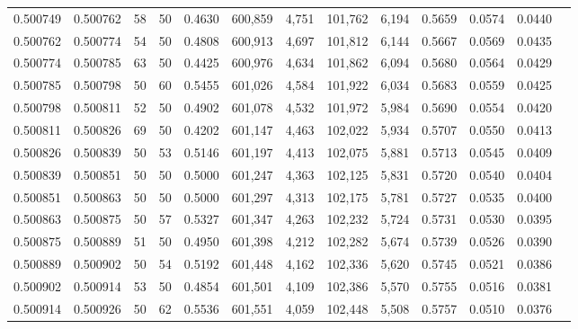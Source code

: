 \begin{tabular}{rrrrrrrrrrrrr}
0.500749 & 0.500762 &    58 &  50 &                                     0.4630 & 600,859 &   4,751 & 101,762 &   6,194 & 0.5659 & 0.0574 & 0.0440 \\
0.500762 & 0.500774 &    54 &  50 &                                     0.4808 & 600,913 &   4,697 & 101,812 &   6,144 & 0.5667 & 0.0569 & 0.0435 \\
0.500774 & 0.500785 &    63 &  50 &                                     0.4425 & 600,976 &   4,634 & 101,862 &   6,094 & 0.5680 & 0.0564 & 0.0429 \\
0.500785 & 0.500798 &    50 &  60 &                                     0.5455 & 601,026 &   4,584 & 101,922 &   6,034 & 0.5683 & 0.0559 & 0.0425 \\
0.500798 & 0.500811 &    52 &  50 &                                     0.4902 & 601,078 &   4,532 & 101,972 &   5,984 & 0.5690 & 0.0554 & 0.0420 \\
0.500811 & 0.500826 &    69 &  50 &                                     0.4202 & 601,147 &   4,463 & 102,022 &   5,934 & 0.5707 & 0.0550 & 0.0413 \\
0.500826 & 0.500839 &    50 &  53 &                                     0.5146 & 601,197 &   4,413 & 102,075 &   5,881 & 0.5713 & 0.0545 & 0.0409 \\
0.500839 & 0.500851 &    50 &  50 &                                     0.5000 & 601,247 &   4,363 & 102,125 &   5,831 & 0.5720 & 0.0540 & 0.0404 \\
0.500851 & 0.500863 &    50 &  50 &                                     0.5000 & 601,297 &   4,313 & 102,175 &   5,781 & 0.5727 & 0.0535 & 0.0400 \\
0.500863 & 0.500875 &    50 &  57 &                                     0.5327 & 601,347 &   4,263 & 102,232 &   5,724 & 0.5731 & 0.0530 & 0.0395 \\
0.500875 & 0.500889 &    51 &  50 &                                     0.4950 & 601,398 &   4,212 & 102,282 &   5,674 & 0.5739 & 0.0526 & 0.0390 \\
0.500889 & 0.500902 &    50 &  54 &                                     0.5192 & 601,448 &   4,162 & 102,336 &   5,620 & 0.5745 & 0.0521 & 0.0386 \\
0.500902 & 0.500914 &    53 &  50 &                                     0.4854 & 601,501 &   4,109 & 102,386 &   5,570 & 0.5755 & 0.0516 & 0.0381 \\
0.500914 & 0.500926 &    50 &  62 &                                     0.5536 & 601,551 &   4,059 & 102,448 &   5,508 & 0.5757 & 0.0510 & 0.0376 \\

\end{tabular}
